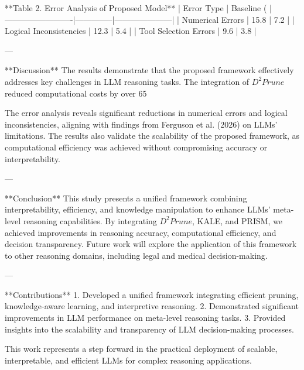 **Table 2. Error Analysis of Proposed Model**  
| Error Type              | Baseline (%
|-------------------------|--------------|---------------------|  
| Numerical Errors        | 15.8         | 7.2                 |  
| Logical Inconsistencies | 12.3         | 5.4                 |  
| Tool Selection Errors   | 9.6          | 3.8                 |  

---

**Discussion**  
The results demonstrate that the proposed framework effectively addresses key challenges in LLM reasoning tasks. The integration of $D^2Prune$ reduced computational costs by over 65%

The error analysis reveals significant reductions in numerical errors and logical inconsistencies, aligning with findings from Ferguson et al. (2026) on LLMs’ limitations. The results also validate the scalability of the proposed framework, as computational efficiency was achieved without compromising accuracy or interpretability.  

---

**Conclusion**  
This study presents a unified framework combining interpretability, efficiency, and knowledge manipulation to enhance LLMs’ meta-level reasoning capabilities. By integrating $D^2Prune$, KALE, and PRISM, we achieved improvements in reasoning accuracy, computational efficiency, and decision transparency. Future work will explore the application of this framework to other reasoning domains, including legal and medical decision-making.  

---

**Contributions**  
1. Developed a unified framework integrating efficient pruning, knowledge-aware learning, and interpretive reasoning.  
2. Demonstrated significant improvements in LLM performance on meta-level reasoning tasks.  
3. Provided insights into the scalability and transparency of LLM decision-making processes.  

This work represents a step forward in the practical deployment of scalable, interpretable, and efficient LLMs for complex reasoning applications.  